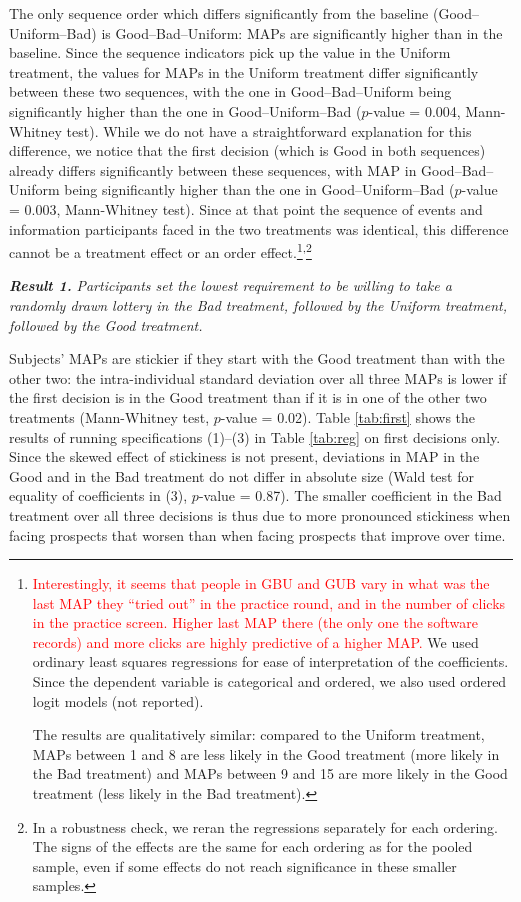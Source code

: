 The only sequence order which differs significantly from the baseline (Good--Uniform--Bad) is Good--Bad--Uniform: MAPs are significantly higher than in the baseline.
Since the sequence indicators pick up the value in the Uniform treatment, the values for MAPs in the Uniform treatment differ significantly between these two sequences, with the one in Good--Bad--Uniform being significantly higher than the one in Good--Uniform--Bad ($p$-value = 0.004, Mann-Whitney test).
While we do not have a straightforward explanation for this difference, we notice that the first decision (which is Good in both sequences) already differs significantly between these sequences, with MAP in Good--Bad--Uniform being significantly higher than the one in Good--Uniform--Bad ($p$-value = 0.003, Mann-Whitney test).
Since at that point the sequence of events and information participants faced in the two treatments was identical, this difference cannot be a treatment effect or an order effect.\footnote{
\textcolor{red}{Interestingly, it seems that people in GBU and GUB vary in what was the last MAP they ``tried out'' in the practice round, and in the number of clicks in the practice screen. Higher last MAP there (the only one the software records) and more clicks are highly predictive of a higher MAP.
}
We used ordinary least squares regressions for ease of interpretation of the coefficients.
Since the dependent variable is categorical and ordered, we also used ordered logit models (not reported).

The results are qualitatively similar: compared to the Uniform treatment, MAPs between 1 and 8 are less likely in the Good treatment (more likely in the Bad treatment) and MAPs between 9 and 15 are more likely in the Good treatment (less likely in the Bad treatment).
}\textsuperscript{,}\footnote{
In a robustness check, we reran the regressions separately for each ordering.
The signs of the effects are the same for each ordering as for the pooled sample, even if some effects do not reach significance in these smaller samples.
}

\textbf{\textit{Result 1.}} \textit{Participants set the lowest requirement to be willing to take a randomly drawn lottery in the Bad treatment, followed by the Uniform treatment, followed by the Good treatment.}

Subjects' MAPs are stickier if they start with the Good treatment than with the other two: the intra-individual standard deviation over all three MAPs is lower if the first decision is in the Good treatment than if it is in one of the other two treatments (Mann-Whitney test, $p$-value = 0.02).
Table \ref{tab:first} shows the results of running specifications (1)--(3) in Table \ref{tab:reg} on first decisions only.
Since the skewed effect of stickiness is not present, deviations in MAP in the Good and in the Bad treatment do not differ in absolute size (Wald test for equality of coefficients in (3), $p$-value = 0.87).
The smaller coefficient in the Bad treatment over all three decisions is thus due to more pronounced stickiness when facing prospects that worsen than when facing prospects that improve over time.

